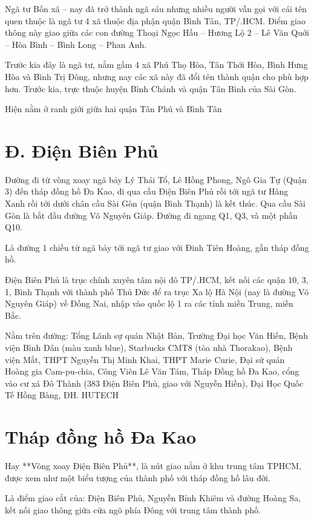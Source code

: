 Ngã tư Bốn xã – nay đã trở thành ngã sáu nhưng nhiều người vẫn gọi với cái tên quen thuộc là ngã tư 4 xã thuộc địa phận quận Bình Tân, TP/.HCM. Điểm giao thông này giao giữa các con đường Thoại Ngọc Hầu – Hương Lộ 2 – Lê Văn Quới – Hòa Bình – Bình Long – Phan Anh.

Trước kia đây là ngã tư, nằm gầm 4 xã Phú Thọ Hòa, Tân Thới Hòa, Bình Hưng Hòa và Bình Trị Đông, nhưng nay các xã này đã đổi tên thành quận cho phù hợp hơn. Trước kia, trực thuộc huyện Bình Chánh và quận Tân Bình của Sài Gòn.

Hiện nằm ở ranh giới giữa hai quận Tân Phú và Bình Tân

\section{Đ. Điện Biên Phủ}

Đường đi từ vòng xoay ngã bảy Lý Thái Tổ, Lê Hồng Phong, Ngô Gia Tự (Quận 3) đến tháp đồng hồ Đa Kao, đi qua cầu Điện Biên Phủ rồi tới ngã tư Hàng Xanh rồi tới dưới chân cầu Sài Gòn (quận Bình Thạnh) là kết thúc. Qua cầu Sài Gòn là bắt đầu đường Võ Nguyên Giáp. Đường đi ngang Q1, Q3, và một phần Q10.

Là đường 1 chiều từ ngã bảy tới ngã tư giao với Đinh Tiên Hoàng, gần tháp đồng hồ.

Điện Biên Phủ là trục chính xuyên tâm nội đô TP/.HCM, kết nối các quận 10, 3, 1, Bình Thạnh với thành phố Thủ Đức để ra trục Xa lộ Hà Nội (nay là đường Võ Nguyên Giáp) về Đồng Nai, nhập vào quốc lộ 1 ra các tỉnh miền Trung, miền Bắc.

Nằm trên đường: Tổng Lãnh sự quán Nhật Bản, Trường Đại học Văn Hiến, Bệnh viện Bình Dân (màu xanh blue), Starbucks CMT8 (tòa nhà Thorakao), Bệnh viện Mắt, THPT Nguyễn Thị Minh Khai, THPT Marie Curie, Đại sứ quán Hoàng gia Cam-pu-chia, Công Viên Lê Văn Tám, Tháp Đồng hồ Đa Kao, cổng vào cư xá Đô Thành (383 Điện Biên Phủ, giao với Nguyễn Hiền), Đại Học Quốc Tế Hồng Bàng, ĐH. HUTECH

\section{Tháp đồng hồ Đa Kao}

Hay **Vòng xoay Điện Biên Phủ**, là nút giao nằm ở khu trung tâm TPHCM, được xem như một biểu tượng của thành phố với tháp đồng hồ lâu đời.

Là điểm giao cắt của: Điện Biên Phủ, Nguyễn Bỉnh Khiêm và đường Hoàng Sa, kết nối giao thông giữa cửa ngõ phía Đông với trung tâm thành phố.

